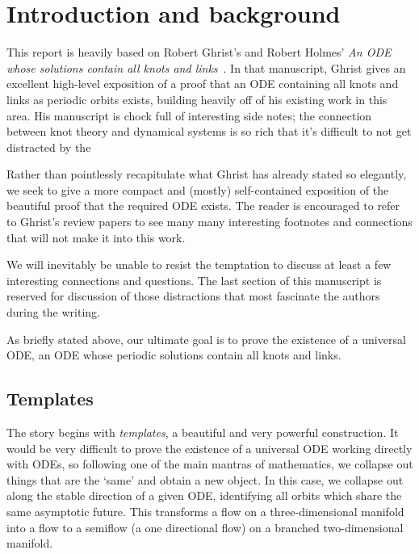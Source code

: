 \documentclass[paper.tex]{subfiles}
\begin{document}
\section{Introduction and background}


This report is heavily based on Robert Ghrist's and Robert Holmes' \emph{An ODE whose solutions contain all knots and links}~\cite{knottyode}.
 In that manuscript, Ghrist gives an excellent high-level exposition of a proof that an ODE containing
all knots and links as periodic orbits exists, building heavily off of his existing work in this area. His manuscript is chock full of interesting side notes; the connection between knot theory and dynamical systems is so rich
that it's difficult to not get distracted by the

Rather than pointlessly recapitulate what Ghrist has already stated so elegantly, we seek to give a more compact and (mostly) self-contained exposition of the beautiful proof that the required ODE exists. The reader is encouraged to
refer to Ghrist's review papers \cite{knottyode}\cite{chaoticknots}to see many many interesting footnotes and connections that will not make it into this work.

We will inevitably be unable to resist the temptation to discuss at least a few interesting connections and questions. The last section of this manuscript is reserved for discussion of those distractions that most fascinate the
authors during the writing.

As briefly stated above, our ultimate goal is to prove the existence of a universal ODE, an ODE whose periodic solutions contain all knots and links.


\subsection{Templates}

The story begins with \emph{templates}, a beautiful and very powerful construction. It would be very difficult to prove the existence of a universal ODE working directly with ODEs, so following one of the main mantras
of mathematics, we collapse out things that are the `same' and obtain a new object. In this case, we collapse out along the stable direction of a given ODE, identifying all orbits which share the same asymptotic future.
This transforms a flow on a three-dimensional manifold into a flow to a semiflow (a one directional flow) on a branched two-dimensional manifold.
\end{document}
